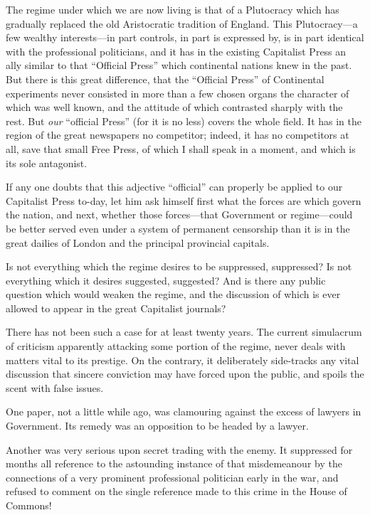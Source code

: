 \documentclass{book}
\begin{document}
The regime under which we are now living is that of a Plutocracy which has gradually replaced the old Aristocratic tradition of England. This Plutocracy—a few wealthy interests—in part controls, in part is expressed by, is in part identical with the professional politicians, and it has in the existing Capitalist Press an ally similar to that “Official Press” which continental nations knew in the past. But there is this great difference, that the “Official Press” of Continental experiments never consisted in more than a few chosen organs the character of which was well known, and the attitude of which contrasted sharply with the rest. But \emph{our} “official Press” (for it is no less) covers the whole field. It has in the region of the great newspapers no competitor; indeed, it has no competitors at all, save that small Free Press, of which I shall speak in a moment, and which is its sole antagonist.

If any one doubts that this adjective “official” can properly be applied to our Capitalist Press to-day, let him ask himself first what the forces are which govern the nation, and next, whether those forces—that Government or regime—could be better served even under a system of permanent censorship than it is in the great dailies of London and the principal provincial capitals.

Is not everything which the regime desires to be suppressed, suppressed? Is not everything which it desires suggested, suggested? And is there any public question which would weaken the regime, and the discussion of which is ever allowed to appear in the great Capitalist journals?

There has not been such a case for at least twenty years. The current simulacrum of criticism apparently attacking some portion of the regime, never deals with matters vital to its prestige. On the contrary, it deliberately side-tracks any vital discussion that sincere conviction may have forced upon the public, and spoils the scent with false issues.

One paper, not a little while ago, was clamouring against the excess of lawyers in Government. Its remedy was an opposition to be headed by a lawyer.

Another was very serious upon secret trading with the enemy. It suppressed for months all reference to the astounding instance of that misdemeanour by the connections of a very prominent professional politician early in the war, and refused to comment on the single reference made to this crime in the House of Commons!
\end{document}
